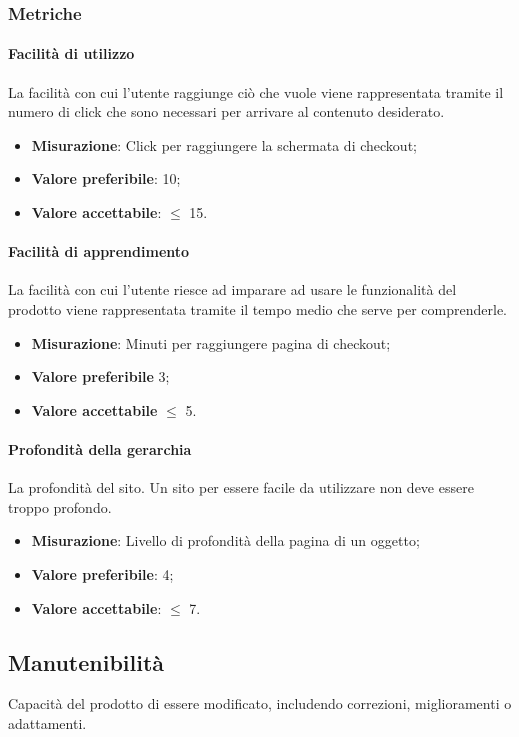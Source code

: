 		\subsubsection{Metriche}
			\paragraph{Facilità di utilizzo}
			La facilità con cui l'utente raggiunge ciò che vuole viene rappresentata tramite il numero di click che sono necessari per arrivare al contenuto desiderato.
			\begin{itemize}
			\item \textbf{Misurazione}: Click per raggiungere la schermata di checkout;
			\item \textbf{Valore preferibile}: 10;
			\item \textbf{Valore accettabile}: $\leq$ 15.
			\end{itemize}
			\paragraph{Facilità di apprendimento}
			La facilità con cui l'utente riesce ad imparare ad usare le funzionalità del prodotto viene rappresentata tramite il tempo medio che serve per comprenderle.
			\begin{itemize}
			\item \textbf{Misurazione}: Minuti per raggiungere pagina di checkout;
			\item \textbf{Valore preferibile} 3;
			\item\textbf{Valore accettabile} $\leq$ 5.
			\end{itemize}
			\paragraph{Profondità della gerarchia}
			La profondità del sito. Un sito per essere facile da utilizzare non deve essere troppo profondo.
			\begin{itemize}
			\item \textbf{Misurazione}: Livello di profondità della pagina di un oggetto;
			\item \textbf{Valore preferibile}: 4;
			\item \textbf{Valore accettabile}: $\leq$ 7.
			\end{itemize}
	\subsection{Manutenibilità}
	Capacità del prodotto di essere modificato, includendo correzioni, miglioramenti o adattamenti.
